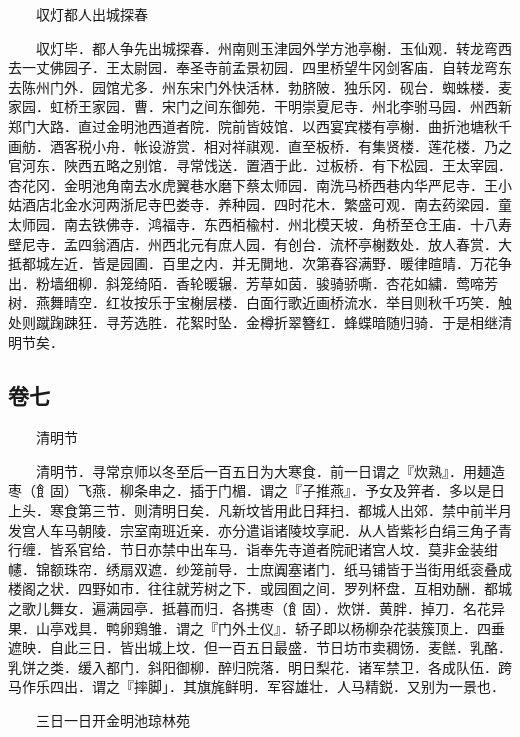 　　収灯都人出城探春

　　収灯毕．都人争先出城探春．州南则玉津园外学方池亭榭．玉仙观．转龙弯西去一丈佛园子．王太尉园．奉圣寺前孟景初园．四里桥望牛冈剑客庙．自转龙弯东去陈州门外．园馆尤多．州东宋门外快活林．勃脐陂．独乐冈．砚台．蜘蛛楼．麦家园．虹桥王家园．曹．宋门之间东御苑．干明崇夏尼寺．州北李驸马园．州西新郑门大路．直过金明池西道者院．院前皆妓馆．以西宴宾楼有亭榭．曲折池塘秋千画舫．酒客税小舟．帐设游赏．相对祥祺观．直至板桥．有集贤楼．莲花楼．乃之官河东．陜西五略之别馆．寻常饯送．置酒于此．过板桥．有下松园．王太宰园．杏花冈．金明池角南去水虎翼巷水磨下蔡太师园．南洗马桥西巷内华严尼寺．王小姑酒店北金水河两浙尼寺巴娄寺．养种园．四时花木．繁盛可观．南去药梁园．童太师园．南去铁佛寺．鸿福寺．东西栢楡村．州北模天坡．角桥至仓王庙．十八寿壁尼寺．孟四翁酒店．州西北元有庶人园．有创台．流杯亭榭数处．放人春赏．大抵都城左近．皆是园圃．百里之内．并无閴地．次第春容满野．暖律暄晴．万花争出．粉墙细柳．斜笼绮陌．香轮暖辗．芳草如茵．骏骑骄嘶．杏花如繍．莺啼芳树．燕舞晴空．红妆按乐于宝榭层楼．白面行歌近画桥流水．举目则秋千巧笑．触处则蹴踘踈狂．寻芳选胜．花絮时坠．金樽折翠簪红．蜂蝶暗随归骑．于是相继清明节矣．

\hypertarget{ux5377ux4e03}{%
\subsection{卷七}\label{ux5377ux4e03}}

　　清明节

　　清明节．寻常京师以冬至后一百五日为大寒食．前一日谓之『炊熟』．用麺造枣（飠固）飞燕．柳条串之．插于门楣．谓之『子推燕』．予女及笄者．多以是日上头．寒食第三节．则清明日矣．凡新坟皆用此日拜扫．都城人出郊．禁中前半月发宫人车马朝陵．宗室南班近亲．亦分遣诣诸陵坟享祀．从人皆紫衫白绢三角子青行缠．皆系官给．节日亦禁中出车马．诣奉先寺道者院祀诸宫人坟．莫非金装绀幰．锦额珠帘．绣扇双遮．纱笼前导．士庶阗塞诸门．纸马铺皆于当街用纸衮叠成楼阁之状．四野如市．往往就芳树之下．或园囿之间．罗列杯盘．互相劝酬．都城之歌儿舞女．遍满园亭．抵暮而归．各携枣（飠固）．炊饼．黄胖．掉刀．名花异果．山亭戏具．鸭卵鶏雏．谓之『门外土仪』．轿子即以杨柳杂花装簇顶上．四垂遮映．自此三日．皆出城上坟．但一百五日最盛．节日坊市卖稠饧．麦餻．乳酪．乳饼之类．缓入都门．斜阳御柳．醉归院落．明日梨花．诸军禁卫．各成队伍．跨马作乐四出．谓之『摔脚」．其旗旄鲜明．军容雄壮．人马精鋭．又别为一景也．

　　三日一日开金明池琼林苑

